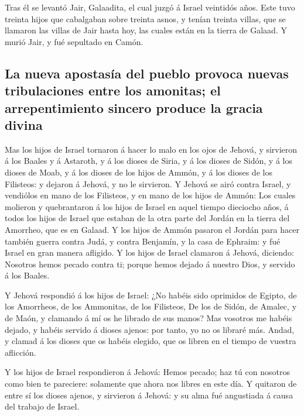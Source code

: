 Tras él se levantó Jair, Galaadita, el cual juzgó á
Israel veintidós años.  Este tuvo treinta hijos que
cabalgaban sobre treinta asnos, y tenían treinta villas, que se llamaron
las villas de Jair hasta hoy, las cuales están en la tierra de Galaad.
 Y murió Jair, y fué sepultado en Camón.

\hypertarget{la-nueva-apostasuxeda-del-pueblo-provoca-nuevas-tribulaciones-entre-los-amonitas-el-arrepentimiento-sincero-produce-la-gracia-divina}{%
\subsection{La nueva apostasía del pueblo provoca nuevas tribulaciones
entre los amonitas; el arrepentimiento sincero produce la gracia
divina}\label{la-nueva-apostasuxeda-del-pueblo-provoca-nuevas-tribulaciones-entre-los-amonitas-el-arrepentimiento-sincero-produce-la-gracia-divina}}

 Mas los hijos de Israel tornaron á hacer lo malo en los
ojos de Jehová, y sirvieron á los Baales y á Astaroth, y á los dioses de
Siria, y á los dioses de Sidón, y á los dioses de Moab, y á los dioses
de los hijos de Ammón, y á los dioses de los Filisteos: y dejaron á
Jehová, y no le sirvieron.  Y Jehová se airó contra
Israel, y vendiólos en mano de los Filisteos, y en mano de los hijos de
Ammón:  Los cuales molieron y quebrantaron á los hijos de
Israel en aquel tiempo dieciocho años, á todos los hijos de Israel que
estaban de la otra parte del Jordán en la tierra del Amorrheo, que es en
Galaad.  Y los hijos de Ammón pasaron el Jordán para hacer
también guerra contra Judá, y contra Benjamín, y la casa de Ephraim: y
fué Israel en gran manera afligido.  Y los hijos de
Israel clamaron á Jehová, diciendo: Nosotros hemos pecado contra ti;
porque hemos dejado á nuestro Dios, y servido á los Baales.

 Y Jehová respondió á los hijos de Israel: ¿No habéis
sido oprimidos de Egipto, de los Amorrheos, de los Ammonitas, de los
Filisteos,  De los de Sidón, de Amalec, y de Maón, y
clamando á mí os he librado de sus manos?  Mas vosotros
me habéis dejado, y habéis servido á dioses ajenos: por tanto, yo no os
libraré más.  Andad, y clamad á los dioses que os habéis
elegido, que os libren en el tiempo de vuestra aflicción.

 Y los hijos de Israel respondieron á Jehová: Hemos
pecado; haz tú con nosotros como bien te pareciere: solamente que ahora
nos libres en este día.  Y quitaron de entre sí los
dioses ajenos, y sirvieron á Jehová: y su alma fué angustiada á causa
del trabajo de Israel.

